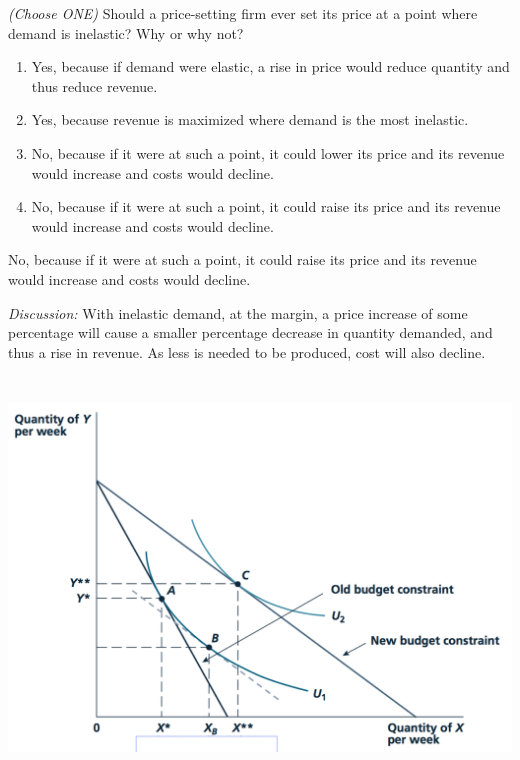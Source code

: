 \documentclass[]{article}
\begin{document}
\emph{(Choose ONE)} Should a price-setting firm ever set its price at a
point where demand is inelastic? Why or why not?

\begin{enumerate}
\def\labelenumi{\Alph{enumi}.}
\item
  Yes, because if demand were elastic, a rise in price would reduce
  quantity and thus reduce revenue.
\item
  Yes, because revenue is maximized where demand is the most inelastic.
\item
  No, because if it were at such a point, it could lower its price and
  its revenue would increase and costs would decline.
\item
  No, because if it were at such a point, it could raise its price and
  its revenue would increase and costs would decline.
\end{enumerate}

No, because if it were at such a point, it could raise its price and its
revenue would increase and costs would decline.

\emph{Discussion:} With inelastic demand, at the margin, a price
increase of some percentage will cause a smaller percentage decrease in
quantity demanded, and thus a rise in revenue. As less is needed to be
produced, cost will also decline.

\hypertarget{section-13}{%
\subsubsection{}\label{section-13}}

\includegraphics[width=\textwidth,height=4in]{../picsfigs/subst_income_effects.png}
\end{document}
